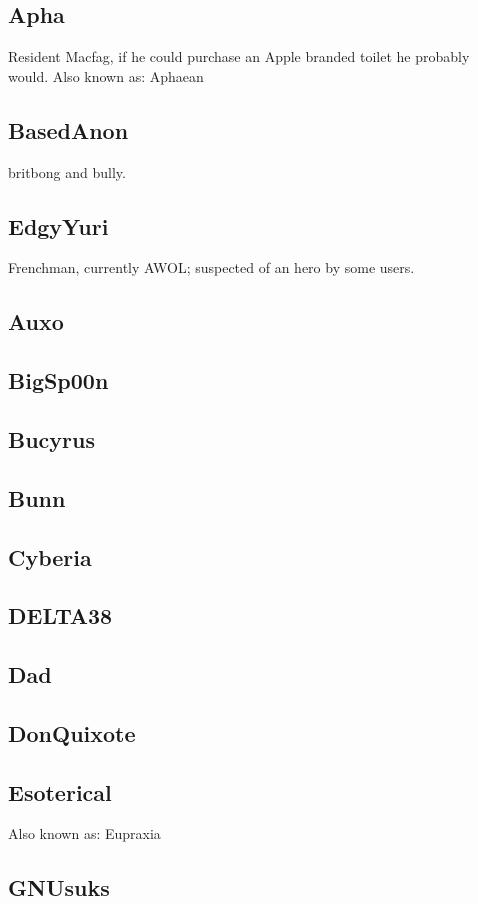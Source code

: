 \documentclass[12pt]{report}
\begin{document}
{\subsection{Apha}
Resident Macfag, if he could purchase an Apple branded toilet he probably would. 
Also known as: Aphaean

\subsection{BasedAnon}
britbong and bully. 

\subsection{EdgyYuri}
Frenchman, currently AWOL; suspected of an hero by some users.

\subsection{Auxo}
\subsection{BigSp00n}
\subsection{Bucyrus}
\subsection{Bunn}
\subsection{Cyberia}
\subsection{DELTA38}
\subsection{Dad}
\subsection{DonQuixote}
\subsection{Esoterical}
Also known as: Eupraxia
\subsection{GNUsuks}
}
\end{document}
